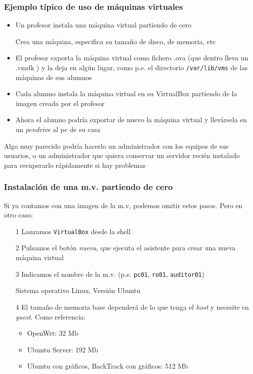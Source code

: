 \documentclass[ucs]{beamer}
\begin{document}
\begin{frame}[fragile]
\frametitle{Ejemplo típico de uso de máquinas virtuales}
\begin{itemize}
\item
Un profesor instala una máquina virtual partiendo de cero 

Crea una máquina, especifica su tamaño de disco, de memoria, etc

\item
El profesor exporta la máquina virtual como fichero .ova (que dentro lleva un 
 .vmdk )
y la deja en algún lugar, como p.e. el directorio \verb|/var/lib/vms|
de las máquinas de sus alumnos

\item
Cada alumno instala la máquina virtual en su VirtualBox partiendo de la imagen creada
por el profesor


\item
Ahora el alumno podría exportar de nuevo la máquina virtual y llevársela
en un \emph{pendrive} al pc de su casa
\end{itemize}

Algo muy parecido podría hacerlo un administrador con los equipos de
sus usuarios, o un administrador que quiera conservar un servidor
recién instalado para recuperarlo rápidamente si hay problemas

\end{frame}
\begin{frame}[fragile]
\frametitle{Instalación de una m.v. partiendo de cero}
Si ya contamos con una imagen de la m.v, podemos omitir estos pasos. Pero en otro caso:
\begin{enumerate}
\item[1]
Lanzamos \verb|VirtualBox| desde la shell

\item[2]
Pulsamos el botón \emph{nueva}, que ejecuta el 
asistente para crear una nueva máquina virtual

\item[3]
Indicamos el nombre de la m.v. (p.e. \verb|pc01|, \verb|ro01|, \verb|auditor01|) 

Sistema operativo Linux, Versión Ubuntu

\item[4]
El tamaño de memoria base dependerá de lo que tenga el \emph{host} y necesite en \emph{guest}. 
Como referencia:

\begin{itemize}
\item
OpenWrt: 32 Mb
\item
Ubuntu Server: 192 Mb
\item
Ubuntu con gráficos, BackTrack con gráficos: 512 Mb

\end{itemize}
\end{enumerate}


\end{frame}
\end{document}
